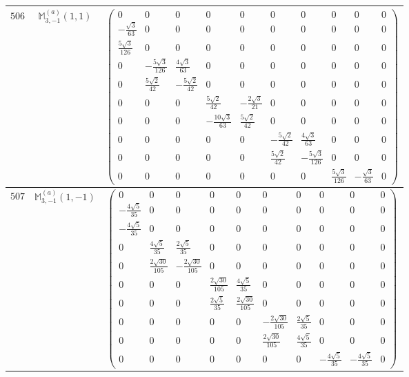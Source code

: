 \documentclass[fleqn,8pt,landscape]{jsarticle}
\begin{document}
\begin{center}
\begin{longtable}{ccc}
$ 506 $ & $ \mathbb{M}_{3,-1}^{(a)}(1,1) $ & $ \begin{pmatrix} 0 & 0 & 0 & 0 & 0 & 0 & 0 & 0 & 0 & 0 \\ - \frac{\sqrt{3}}{63} & 0 & 0 & 0 & 0 & 0 & 0 & 0 & 0 & 0 \\ \frac{5 \sqrt{3}}{126} & 0 & 0 & 0 & 0 & 0 & 0 & 0 & 0 & 0 \\ 0 & - \frac{5 \sqrt{3}}{126} & \frac{4 \sqrt{3}}{63} & 0 & 0 & 0 & 0 & 0 & 0 & 0 \\ 0 & \frac{5 \sqrt{2}}{42} & - \frac{5 \sqrt{2}}{42} & 0 & 0 & 0 & 0 & 0 & 0 & 0 \\ 0 & 0 & 0 & \frac{5 \sqrt{2}}{42} & - \frac{2 \sqrt{3}}{21} & 0 & 0 & 0 & 0 & 0 \\ 0 & 0 & 0 & - \frac{10 \sqrt{3}}{63} & \frac{5 \sqrt{2}}{42} & 0 & 0 & 0 & 0 & 0 \\ 0 & 0 & 0 & 0 & 0 & - \frac{5 \sqrt{2}}{42} & \frac{4 \sqrt{3}}{63} & 0 & 0 & 0 \\ 0 & 0 & 0 & 0 & 0 & \frac{5 \sqrt{2}}{42} & - \frac{5 \sqrt{3}}{126} & 0 & 0 & 0 \\ 0 & 0 & 0 & 0 & 0 & 0 & 0 & \frac{5 \sqrt{3}}{126} & - \frac{\sqrt{3}}{63} & 0 \end{pmatrix} $ \\ \hline
$ 507 $ & $ \mathbb{M}_{3,-1}^{(a)}(1,-1) $ & $ \begin{pmatrix} 0 & 0 & 0 & 0 & 0 & 0 & 0 & 0 & 0 & 0 \\ - \frac{4 \sqrt{5}}{35} & 0 & 0 & 0 & 0 & 0 & 0 & 0 & 0 & 0 \\ - \frac{4 \sqrt{5}}{35} & 0 & 0 & 0 & 0 & 0 & 0 & 0 & 0 & 0 \\ 0 & \frac{4 \sqrt{5}}{35} & \frac{2 \sqrt{5}}{35} & 0 & 0 & 0 & 0 & 0 & 0 & 0 \\ 0 & \frac{2 \sqrt{30}}{105} & - \frac{2 \sqrt{30}}{105} & 0 & 0 & 0 & 0 & 0 & 0 & 0 \\ 0 & 0 & 0 & \frac{2 \sqrt{30}}{105} & \frac{4 \sqrt{5}}{35} & 0 & 0 & 0 & 0 & 0 \\ 0 & 0 & 0 & \frac{2 \sqrt{5}}{35} & \frac{2 \sqrt{30}}{105} & 0 & 0 & 0 & 0 & 0 \\ 0 & 0 & 0 & 0 & 0 & - \frac{2 \sqrt{30}}{105} & \frac{2 \sqrt{5}}{35} & 0 & 0 & 0 \\ 0 & 0 & 0 & 0 & 0 & \frac{2 \sqrt{30}}{105} & \frac{4 \sqrt{5}}{35} & 0 & 0 & 0 \\ 0 & 0 & 0 & 0 & 0 & 0 & 0 & - \frac{4 \sqrt{5}}{35} & - \frac{4 \sqrt{5}}{35} & 0 \end{pmatrix} $ \\ \hline

\end{longtable}
\end{center}
\end{document}
